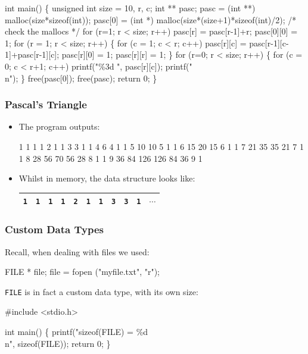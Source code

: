\documentclass[table]{beamer}
\newif\ifschigh\schighfalse
\newcommand{\kw}[1]{\ifschigh\textcolor{red}{#1}\else\textcolor{keyword}{#1}\fi}
\newcommand{\kt}[1]{\ifschigh\textcolor{red}{#1}\else\textcolor{ctext}{#1}\fi}
\newcommand{\kc}[1]{\ifschigh\textcolor{red}{#1}\else\textcolor{comment}{#1}\fi}
\newcounter{sckll}
\newcommand{\kr}{\setcounter{sckll}{1}}
\newcommand{\kl}{}
\begin{document}
\begin{frame}[fragile]
\begin{semiverbatim}
\scriptsize
\kr\kl\kw{int} main()
\kl\{
\kl   \kw{unsigned int} size = 10, r, c;
\kl   \kw{int} ** pasc;
\kl   pasc = (\kw{int} **) malloc(size*sizeof(int));
\kl   pasc[0] = (\kw{int} *) malloc(size*(size+1)*sizeof(int)/2);
\kl   \kc{/* check the mallocs */}
\kl   \kw{for} (r=1; r < size; r++) pasc[r] = pasc[r-1]+r;
\kl   pasc[0][0] = 1;
\kl   \kw{for} (r = 1; r < size; r++)
\kl   \{
\kl      \kw{for} (c = 1; c < r; c++)
\kl         pasc[r][c] = pasc[r-1][c-1]+pasc[r-1][c];
\kl      pasc[r][0] = 1; pasc[r][r] = 1;
\kl   \}
\kl   \kw{for} (r=0; r < size; r++)
\kl   \{
\kl      \kw{for} (c = 0; c < r+1; c++)
\kl         printf(\kt{"\%3d "}, pasc[r][c]);
\kl      printf(\kt{"\\n"});
\kl   \}
\kl   free(pasc[0]);
\kl   free(pasc);
\kl   \kw{return} 0;
\kl\}
\end{semiverbatim}
\end{frame}

\begin{frame}[fragile]
\frametitle{Pascal's Triangle}
\begin{itemize}
\item The program outputs:
\vspace{-0.2in}
\begin{semiverbatim}
\small
  1
  1   1
  1   2   1
  1   3   3   1
  1   4   6   4   1
  1   5  10  10   5   1
  1   6  15  20  15   6   1
  1   7  21  35  35  21   7   1
  1   8  28  56  70  56  28   8   1
  1   9  36  84 126 126  84  36   9   1
\end{semiverbatim}
\item Whilst in memory, the data structure looks like:
\begin{tabular}{|c|c|c|c|c|c|c|c|c|c|c|}
\hline
\tt1&\tt1&\tt1&\tt1&\tt2&\tt1&\tt1&\tt3&\tt3&\tt1&$\cdots$\\
\hline
\end{tabular}
\end{itemize}
\end{frame}

\begin{frame}[fragile]
\frametitle{Custom Data Types}
Recall, when dealing with files we used:
\begin{semiverbatim}
FILE * file;
file = fopen (\kt{"myfile.txt"}, \kt{"r"});
\end{semiverbatim}
{\tt FILE} is in fact a custom data type, with its own size:
\begin{semiverbatim}
\kw{\#include} \kt{<stdio.h>}

\kw{int} main()
\{
   printf(\kt{"sizeof(FILE) = \%d\\n"}, \kw{sizeof}(FILE));
   \kw{return} 0;
\}
\end{semiverbatim}
\end{frame}
\end{document}
